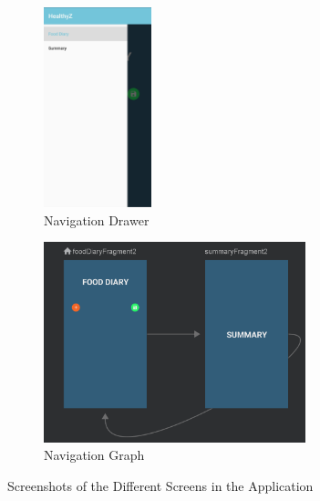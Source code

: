 \documentclass{article}
\begin{document}
\begin{figure}[h]
\centering
\hspace*{-3.5cm} 
\begin{subfigure}{.4\textwidth}
  \centering
  \includegraphics[height = 5.8cm]{navigation_drawer.jpg}
  \caption{Navigation Drawer}
  \label{fig:nav_drawer_label}
\end{subfigure}%
\begin{subfigure}{.4\textwidth}
  \centering
  \includegraphics[height = 5.8cm]{nav_graph.png}
  \caption{Navigation Graph}
  \label{fig:nav_graph_label}
\end{subfigure}
\caption{Screenshots of the Different Screens in the Application}
\label{fig:navigation_label}
\end{figure}
\end{document}

